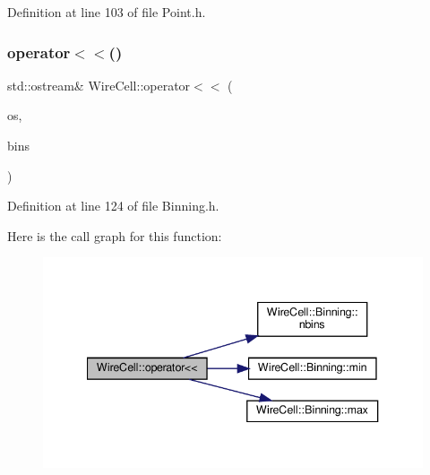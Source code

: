Definition at line 103 of file Point.\+h.

\mbox{\label{namespace_wire_cell_a7c36c8ada205f970a75ddb4e0841ff43}} 
\subsubsection{\texorpdfstring{operator$<$$<$()}{operator<<()}\hspace{0.1cm}{\footnotesize\ttfamily [4/6]}}
{\footnotesize\ttfamily std\+::ostream\& Wire\+Cell\+::operator$<$$<$ (\begin{DoxyParamCaption}\item[{std\+::ostream \&}]{os,  }\item[{const \hyperlink{class_wire_cell_1_1_binning}{Wire\+Cell\+::\+Binning} \&}]{bins }\end{DoxyParamCaption})\hspace{0.3cm}{\ttfamily [inline]}}



Definition at line 124 of file Binning.\+h.

Here is the call graph for this function\+:
\nopagebreak
\begin{figure}[H]
\begin{center}
\leavevmode
\includegraphics[width=340pt]{namespace_wire_cell_a7c36c8ada205f970a75ddb4e0841ff43_cgraph}
\end{center}
\end{figure}
\mbox{\label{namespace_wire_cell_a7aeb1994aad6589e9d1da7fc24a4b977}} 
